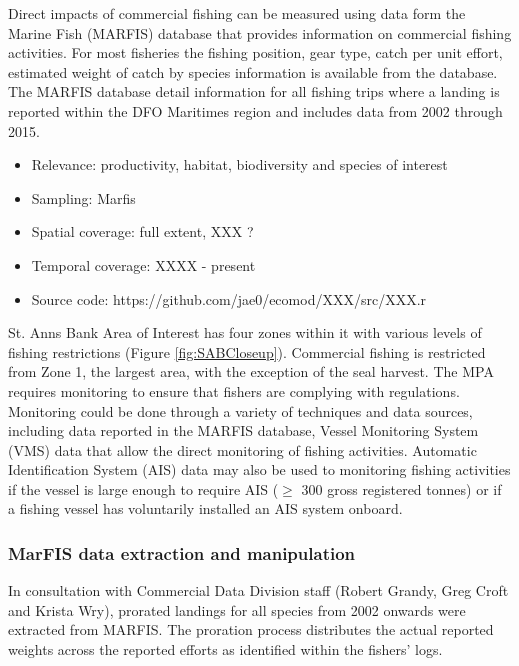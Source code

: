 \documentclass[letterpaper,portrait,11pt]{scrartcl}
\numberwithin{equation}{section}		%
\numberwithin{figure}{section}			%
\numberwithin{table}{section}				%
\begin{document}
Direct impacts of commercial fishing can be measured using data form the Marine Fish (MARFIS) database that provides information on commercial fishing activities.  For most fisheries the fishing position, gear type, catch per unit effort, estimated weight of catch by species information is available from the database. The MARFIS database detail information for all fishing trips where a landing is reported within the DFO Maritimes region and includes data from 2002 through 2015.  

\begin{itemize}
  \item Relevance:  productivity, habitat, biodiversity and species of interest
  \item Sampling:  Marfis
  \item Spatial coverage: full extent, XXX ?
  \item Temporal coverage: XXXX - present
  \item Source code: https://github.com/jae0/ecomod/XXX/src/XXX.r
\end{itemize}	




St. Anns Bank Area of Interest has four zones within it with various levels of fishing restrictions (Figure \ref{fig:SABCloseup}). Commercial fishing is restricted from Zone 1, the largest area, with the exception of the seal harvest.  The MPA requires monitoring to ensure that fishers are complying with regulations.  Monitoring could be done through a variety of techniques and data sources, including data reported in the MARFIS database, Vessel Monitoring System (VMS) data that allow the direct monitoring of fishing activities. Automatic Identification System (AIS) data may also be used to monitoring fishing activities if the vessel is large enough to require AIS ($\geq$ 300 gross registered tonnes) or if a fishing vessel has voluntarily installed an AIS system onboard.  


\subsubsection{MarFIS data extraction and manipulation}

In consultation with Commercial Data Division staff (Robert Grandy, Greg Croft and Krista Wry), prorated landings for all species from 2002 onwards were extracted from MARFIS. The proration process distributes the actual reported weights across the reported efforts as identified within the fishers' logs.
\end{document}

